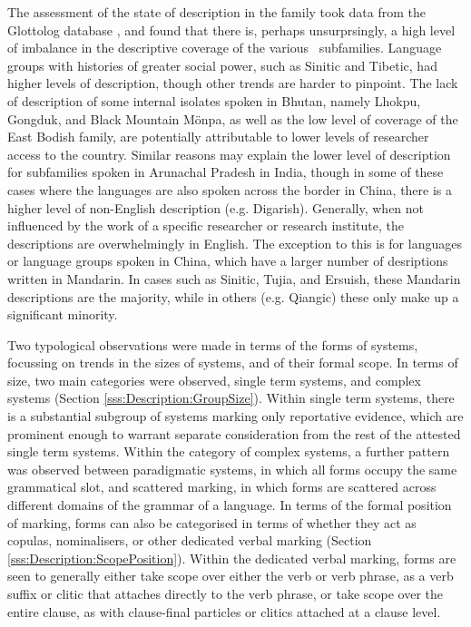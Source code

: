The assessment of the state of description in the family took data from the Glottolog database \cite{glottolog}, and found that there is, perhaps unsurprsingly, a high level of imbalance in the descriptive coverage of the various \lfam\ subfamilies. Language groups with histories of greater social power, such as Sinitic and Tibetic, had higher levels of description, though other trends are harder to pinpoint. The lack of description of some internal isolates spoken in Bhutan, namely Lhokpu, Gongduk, and Black Mountain Mönpa, as well as the low level of coverage of the East Bodish family, are potentially attributable to lower levels of researcher access to the country. Similar reasons may explain the lower level of description for subfamilies spoken in Arunachal Pradesh in India, though in some of these cases where the languages are also spoken across the border in China, there is a higher level of non-English description (e.g. Digarish). Generally, when not influenced by the work of a specific researcher or research institute, the descriptions are overwhelmingly in English. The exception to this is for languages or language groups spoken in China, which have a larger number of desriptions written in Mandarin. In cases such as Sinitic, Tujia, and Ersuish, these Mandarin descriptions are the majority, while in others (e.g. Qiangic) these only make up a significant minority.

Two typological observations were made in terms of the forms of systems, focussing on trends in the sizes of systems, and of their formal scope. In terms of size, two main categories were observed, single term systems, and complex systems (Section \ref{sss:Description:GroupSize}). Within single term systems, there is a substantial subgroup of systems marking only reportative evidence, which are prominent enough to warrant separate consideration from the rest of the attested single term systems. Within the category of complex systems, a further pattern was observed between paradigmatic systems, in which all forms occupy the same grammatical slot, and scattered marking, in which forms are scattered across different domains of the grammar of a language. In terms of the formal position of marking, forms can also be categorised in terms of whether they act as copulas, nominalisers, or other dedicated verbal marking (Section \ref{sss:Description:ScopePosition}). Within the dedicated verbal marking, forms are seen to generally either take scope over either the verb or verb phrase, as a verb suffix or clitic that attaches directly to the verb phrase, or take scope over the entire clause, as with clause-final particles or clitics attached at a clause level.

